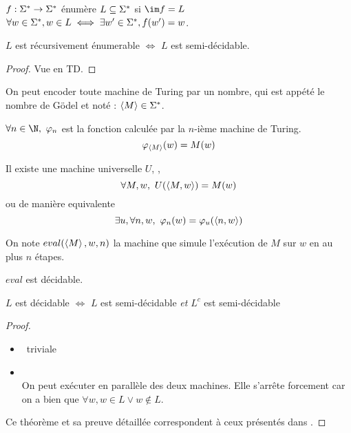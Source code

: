 \begin{definition}
	$f : \Sigma^{*} \to \Sigma^{*}$ énumère $L \subseteq \Sigma^{*}$ si $\im f = L$ \ie $\forall w \in \Sigma^{*}, w \in L \iff \exists w' \in \Sigma^{*}, f (w') = w$.
\end{definition}

\begin{prop}
	$L$ est récursivement énumerable $\iff$ $L$ est semi-décidable.
\end{prop}

\begin{proof}
	Vue en TD.
\end{proof}


On peut encoder toute machine de Turing par un nombre, qui est appété le nombre de Gödel et noté : $\left\langle M\right\rangle \in \Sigma^{*}$.

\begin{definition} \label{def:enum}
	$\forall n \in \N, \ \phi_n$ est la fonction calculée par la $n$-ième machine de Turing.
	$$\varphi_{\left\langle M\right\rangle} (w) = M (w)$$
\end{definition}


\begin{lemma}\label{lem:univ}
	Il existe une machine universelle $U$, \ie, $$\forall M,w, \  U (\left\langle M,w\right\rangle) = M (w)$$
	ou de manière equivalente
	$$\exists u, \forall n,w, \ \varphi_n(w) = \varphi_u(\left\langle n,w\right\rangle)$$
\end{lemma}

\begin{definition}[eval]
	On note $eval(\left\langle M\right\rangle, w, n)$ la machine que simule l'exécution de $M$ sur $w$ en au plus $n$ étapes.
\end{definition}

\begin{prop}[Admis]
	$eval$ est décidable.
\end{prop}

\begin{prop}
	$L$ est décidable $\iff$ $L$ est semi-décidable \emph{et} $L^c$ est semi-décidable
\end{prop}

\begin{proof}
	\begin{itemize}
		\item \bimpLR \ triviale
		\item \bimpRL \\
		      On peut exécuter en parallèle des deux machines. Elle s'arrête forcement car on a bien que $\forall w, w \in L \lor w \notin L$.
	\end{itemize}
	Ce théorème et sa preuve détaillée correspondent à ceux présentés dans \cite[Theorem~4.22]{sipser}.
\end{proof}


